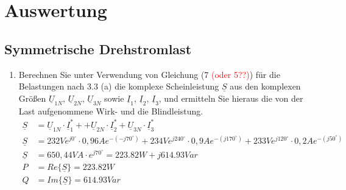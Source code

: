 \section{Auswertung}

\subsection{Symmetrische Drehstromlast }
\begin{enumerate}[label=\alph*)]
  \item Berechnen Sie unter Verwendung von Gleichung (7\textcolor{red}{ (oder 5??)}) für die Belastungen nach 3.3 (a) die komplexe Scheinleistung $\underline S$ aus den komplexen Größen $\underline U_{1N}$, $\underline U_{2N}$, $\underline U_{3N}$ sowie $\underline I_{1}$, $\underline I_{2}$, $\underline I_{3}$, und ermitteln Sie hieraus die von der Last aufgenommene Wirk- und die Blindleistung.
    \begin{align*}
      \underline S &= \underline U_{1N} \cdot \underline I_1^* + 
                      +\underline U_{2N} \cdot \underline I_2^*
                      +\underline U_{3N} \cdot \underline I_3^*\\
      \underline S &= 232Ve^{j0^\circ}\cdot 0,96Ae^{-(-j70^\circ)} + 234Ve^{j240^\circ}\cdot 0,9Ae^{-(j170^\circ)} + 233Ve^{j120^\circ}\cdot 0,2Ae^{-(j50^\circ)}\\ 
      \underline S &= 650,44 VA \cdot e^{j70^\circ} = 223.82 W + j614.93 Var\\
      P &= Re\{\underline S\} = 223.82 W \\
      Q &= Im\{\underline S\} = 614.93 Var
    \end{align*}
		

\end{enumerate}
